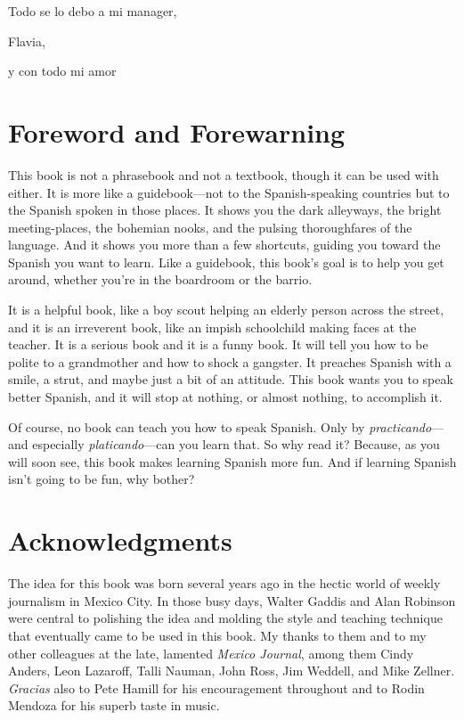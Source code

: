 \pagebreak
\thispagestyle{empty}
\vspace*{3in}

\begin{flushleft}

 Todo se lo debo a mi manager,

 Flavia,

 y con todo mi amor

\end{flushleft}

\chapter{Foreword and Forewarning}

This book is not a phrasebook and not a textbook, though
it can be used with either. It is more like a guidebook---not to the
Spanish-speaking countries but to the Spanish spoken in those places.
It shows you the dark alleyways, the bright meeting-places, the bohemian nooks, and the pulsing thoroughfares of the language. And it
shows you more than a few shortcuts, guiding you toward the Spanish
you want to learn. Like a guidebook, this book's goal is to help you get
around, whether you're in the boardroom or the barrio.

It is a helpful book, like a boy scout helping an elderly person
across the street, and it is an irreverent book, like an impish schoolchild making faces at the teacher. It is a serious book and it is a funny
book. It will tell you how to be polite to a grandmother and how to
shock a gangster. It preaches Spanish with a smile, a strut, and maybe
just a bit of an attitude. This book wants you to speak better Spanish, and it will stop at nothing, or almost nothing, to accomplish it.

Of course, no book can teach you how to speak Spanish. Only
by \emph{practicando}---and especially \emph{platicando}---can you learn that. So
why read it? Because, as you will soon see, this book makes learning
Spanish more fun. And if learning Spanish isn't going to be fun, why
bother?

\chapter{Acknowledgments}

The idea for this book was born several years ago in the hectic world of weekly journalism in Mexico City. In those busy days,
Walter Gaddis and Alan Robinson were central to polishing the idea
and molding the style and teaching technique that eventually came to
be used in this book. My thanks to them and to my other colleagues at
the late, lamented \emph{Mexico Journal}, among them Cindy Anders, Leon
Lazaroff, Talli Nauman, John Ross, Jim Weddell, and Mike Zellner.
\emph{Gracias} also to Pete Hamill for his encouragement throughout and to
Rodin Mendoza for his superb taste in music.

